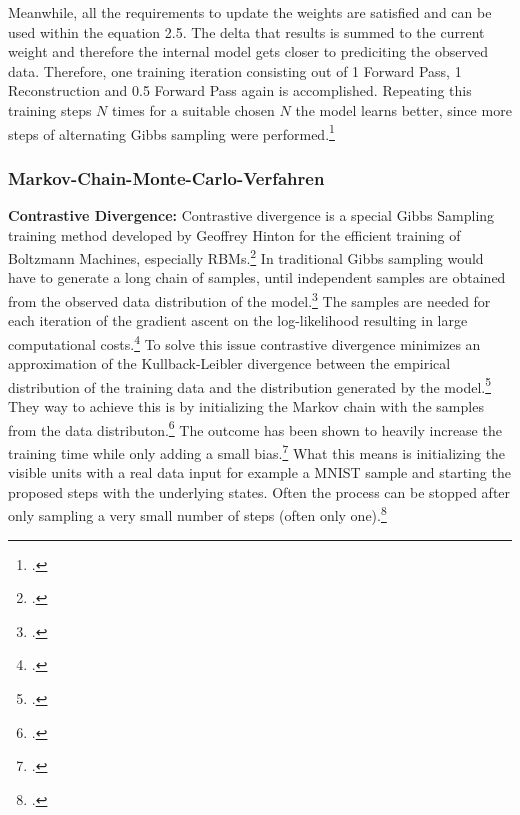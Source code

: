 Meanwhile, all the requirements to update the weights are satisfied and can be used within the equation 2.5. 
The delta that results is summed to the current weight and therefore the internal model gets closer to prediciting the observed data.
Therefore, one training iteration consisting out of 1 Forward Pass, 1 Reconstruction and 0.5 Forward Pass again is accomplished.
Repeating this training steps \( N \) times for a suitable chosen \( N \) the model learns better, since more steps of alternating Gibbs sampling were performed.\footcite[cf.][6]{huembeliPhysicsEnergybasedModels2022}


\subsubsection{Markov-Chain-Monte-Carlo-Verfahren}

\textbf{Contrastive Divergence:} Contrastive divergence is a special Gibbs Sampling training method
developed by Geoffrey Hinton for the efficient training of Boltzmann Machines, especially \ac{RBM}s.\footcite[cf.][4-5]{hintonPracticalGuideTraining2012}
In traditional Gibbs sampling would have to generate a long chain of samples, until
independent samples are obtained from the observed data distribution of the model.\footcite[cf.][5-6]{huembeliPhysicsEnergybasedModels2022}
The samples are needed for each iteration of the gradient ascent on the log-likelihood
resulting in large computational costs.\footcite[cf.][7-8]{upadhyaOverviewRestrictedBoltzmann2019}
To solve this issue contrastive divergence minimizes an approximation of the Kullback-Leibler divergence between the empirical distribution of the training data and the distribution generated by the model.\footcite[cf.][246]{mocanuTopologicalInsightRestricted2016}
They way to achieve this is by initializing the Markov chain with the samples from the data distributon.\footcite[cf.][7-8]{upadhyaOverviewRestrictedBoltzmann2019}
The outcome has been shown to heavily increase the training time while only adding a small bias.\footcite[cf.][537]{larochelleClassificationUsingDiscriminative2008}
What this means is initializing the visible units with a real data input for example a MNIST sample and starting the proposed steps with the underlying states.
Often the process can be stopped after only sampling a very small number of steps (often only one).\footcite[cf.][646]{larochelleLearningAlgorithmsClassification2012}


